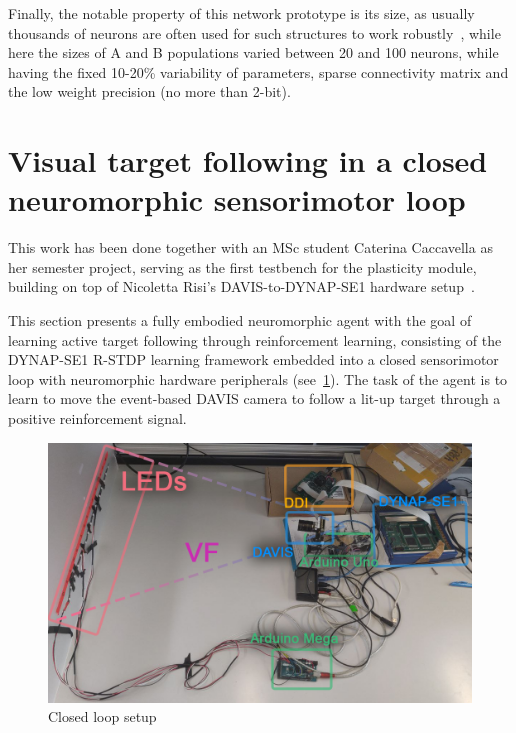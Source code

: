 Finally, the notable property of this network prototype is its size, as usually thousands of neurons are often used for such structures to work robustly~\cite{Diehl_Cook16}, while here the sizes of A and B populations varied between 20 and 100 neurons, while having the fixed 10-20\% variability of parameters, sparse connectivity matrix and the low weight precision (no more than 2-bit).

\newpage
\section{Visual target following in a closed neuromorphic sensorimotor loop}
\label{sec:Caterina's_setup}

This work has been done together with an MSc student Caterina Caccavella as her semester project, serving as the first testbench for the plasticity module, building on top of Nicoletta Risi's DAVIS-to-DYNAP-SE1 hardware setup~\cite{Risi_etal21}.

This section presents a fully embodied neuromorphic agent with the goal of learning active target following through reinforcement learning, consisting of the DYNAP-SE1 R-STDP learning framework embedded into a closed sensorimotor loop with neuromorphic hardware peripherals (see~\ref{fig:camera_closed_loop_setup_photo}). The task of the agent is to learn to move the event-based DAVIS camera to follow a lit-up target through a positive reinforcement signal.

\begin{figure}[h]
  \centering
    \includegraphics[width=\linewidth]{img/chapter5/Caterinas_setup.png}
    \caption[Closed loop setup for the DVS following task photo]{Closed loop setup}
  \label{fig:camera_closed_loop_setup_photo}
\end{figure}

